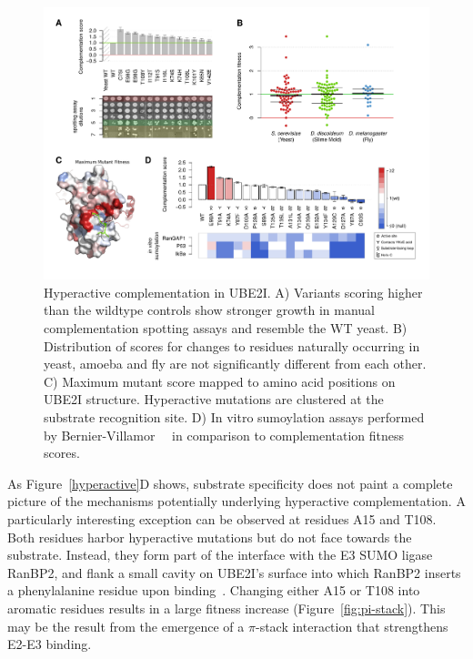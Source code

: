 \begin{figure}[h!]
	\centering
	\includegraphics[width=\textwidth]{img/hyperactive.pdf}
	\caption{Hyperactive complementation in UBE2I. A) Variants scoring higher than the wildtype controls show stronger growth in manual complementation spotting assays and resemble the WT yeast. B) Distribution of scores for changes to residues naturally occurring in yeast, amoeba and fly are not significantly different from each other. C) Maximum mutant score mapped to amino acid positions on UBE2I structure. Hyperactive mutations are clustered at the substrate recognition site. D) In vitro sumoylation assays performed by Bernier-Villamor~\etal~\cite{bernier-villamor_structural_2002} in comparison to complementation fitness scores.}
	\label{fig:hyperactive}
\end{figure}


As Figure~\ref{hyperactive}D shows, substrate specificity does not paint a complete picture of the mechanisms potentially underlying hyperactive complementation. A particularly interesting exception can be observed at residues A15 and T108. Both residues harbor hyperactive mutations but do not face towards the substrate. Instead, they form part of the interface with the E3 SUMO ligase RanBP2, and flank a small cavity on UBE2I’s surface into which RanBP2 inserts a phenylalanine residue upon binding~\cite{gareau_determinants_2012}. Changing either A15 or T108 into aromatic residues results in a large fitness increase (Figure~\ref{fig:pi-stack}). This may be the result from the emergence of a $\pi$-stack interaction that strengthens E2-E3 binding.


